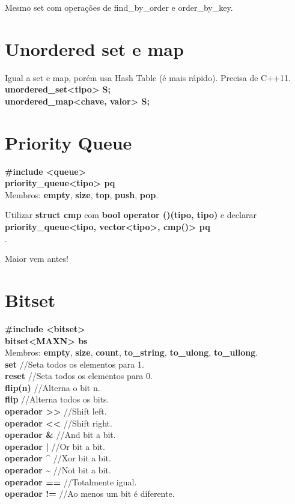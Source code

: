 \begin{multicols}{2}
Mesmo set com operações de find\_by\_order e order\_by\_key.

\section{Unordered set e map}

Igual a set e map, porém usa Hash Table (é mais rápido). Precisa de C++11.\\
\textbf{unordered\_set<tipo> S;}\\
\textbf{unordered\_map<chave, valor> S;}\\

\section{Priority Queue}

\textbf{\#include <queue>}\\
\textbf{priority\_queue<tipo> pq}\\

Membros: \textbf{empty}, \textbf{size}, \textbf{top}, \textbf{push}, \textbf{pop}.

Utilizar \textbf{struct cmp} com \textbf{bool operator ()(tipo, tipo)} e declarar \textbf{priority\_queue<tipo, vector<tipo>, cmp()> pq}\\.

Maior vem antes!

\section{Bitset}

\textbf{\#include <bitset>}\\
\textbf{bitset<MAXN> bs}\\

Membros: \textbf{empty}, \textbf{size}, \textbf{count}, \textbf{to\_string}, \textbf{to\_ulong}, \textbf{to\_ullong}.\\
\textbf{set} //Seta todos os elementos para 1.\\
\textbf{reset} //Seta todos os elementos para 0.\\
\textbf{flip(n)} //Alterna o bit n.\\
\textbf{flip} //Alterna todos os bits.\\
\textbf{operador >>} //Shift left.\\
\textbf{operador <<} //Shift right.\\
\textbf{operador \&} //And bit a bit.\\
\textbf{operador |} //Or bit a bit.\\
\textbf{operador \^} //Xor bit a bit.\\
\textbf{operador \~} //Not bit a bit.\\
\textbf{operador ==} //Totalmente igual.\\
\textbf{operador !=} //Ao menos um bit é diferente.


\end{multicols}
